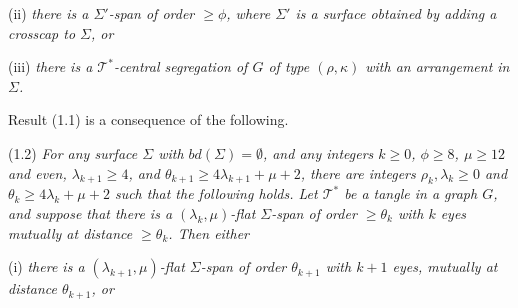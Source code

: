 \hspace*{12pt}(ii) \textit{there is a $\Sigma'$-span of order $\ge \phi$, where $\Sigma'$ is a surface obtained by adding a crosscap to $\Sigma$, or}

\hspace*{12pt}(iii) \textit{there is a $\mathscr{T}^*$-central segregation of $G$ of type $(\rho, \kappa)$ with an arrangement in $\Sigma$.}

Result (1.1) is a consequence of the following.

\stmt
(1.2) \textit{For any surface $\Sigma$ with $bd(\Sigma) = \emptyset$, and any integers $k \ge 0$, $\phi \ge 8$, $\mu \ge 12$ and even, $\lambda_{k+1} \ge 4$, and $\theta_{k+1} \ge 4\lambda_{k+1} + \mu + 2$, there are integers $\rho_k, \lambda_k \ge 0$ and $\theta_k \ge 4\lambda_k + \mu + 2$ such that the following holds. Let $\mathscr{T}^*$ be a tangle in a graph $G$, and suppose that there is a $(\lambda_k, \mu)$-flat $\Sigma$-span of order $\ge \theta_k$ with $k$ eyes mutually at distance $\ge \theta_k$. Then either}

\hspace*{12pt}(i) \textit{there is a $(\lambda_{k+1}, \mu)$-flat $\Sigma$-span of order $\theta_{k+1}$ with $k+1$ eyes, mutually at distance $\theta_{k+1}$, or}

